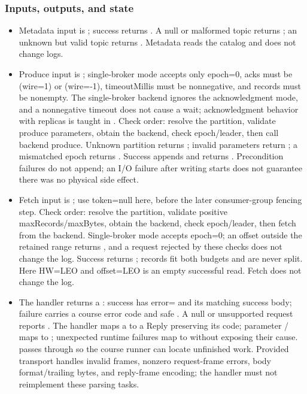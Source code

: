 \subsubsection*{Inputs, outputs, and state}
\begin{itemize}
\item Metadata input is ; success returns . A null or malformed topic returns ; an unknown but valid topic returns . Metadata reads the catalog and does not change logs.
\item Produce input is ; single-broker mode accepts only epoch=0, acks must be  (wire=1) or  (wire=-1), timeoutMillis must be nonnegative, and records must be nonempty. The single-broker backend ignores the acknowledgment mode, and a nonnegative timeout does not cause a wait; acknowledgment behavior with replicas is taught in . Check order: resolve the partition, validate produce parameters, obtain the backend, check epoch/leader, then call backend produce. Unknown partition returns ; invalid parameters return ; a mismatched epoch returns . Success appends and returns . Precondition failures do not append; an I/O failure after writing starts does not guarantee there was no physical side effect.
\item Fetch input is ; use token=null here, before the later consumer-group fencing step. Check order: resolve the partition, validate positive maxRecords/maxBytes, obtain the backend, check epoch/leader, then fetch from the backend. Single-broker mode accepts epoch=0; an offset outside the retained range  returns , and a request rejected by these checks does not change the log. Success returns ; records fit both budgets and are never split. Here HW=LEO and offset=LEO is an empty successful read. Fetch does not change the log.
\item The handler returns a : success has error= and its matching success body; failure carries a course error code and safe . A null or unsupported request reports . The handler maps a  to a Reply preserving its code; parameter / maps to ; unexpected runtime failures map to  without exposing their cause.  passes through so the course runner can locate unfinished work. Provided transport handles invalid frames, nonzero request-frame errors, body format/trailing bytes, and reply-frame encoding; the handler must not reimplement these parsing tasks.
\end{itemize}
